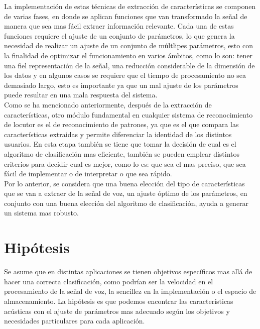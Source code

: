 La implementaci\'on de estas t\'ecnicas de extracci\'on de caracter\'isticas se componen de varias fases, en donde se aplican funciones que van transformado la señal de manera que sea mas f\'acil extraer informaci\'on relevante. Cada una de estas funciones requiere el ajuste de un conjunto de par\'ametros, lo que genera la necesidad de realizar un ajuste de un conjunto de m\'ultlipes par\'ametros, esto con la finalidad de optimizar el funcionamiento en varios \'ambitos, como lo son: tener una fiel representaci\'on de la señal, una reducci\'on considerable de la dimensi\'on de los datos y en algunos casos se requiere que el tiempo de procesamiento no sea demasiado largo, esto es importante ya que un mal ajuste de los par\'ametros puede resultar en una mala respuesta del sistema.\\

Como se ha mencionado anteriormente, despu\'es de la extracci\'on de caracter\'isticas, otro m\'odulo fundamental en cualquier sistema de reconocimiento de locutor es el de reconocimiento de patrones, ya que es el que compara las caracter\'isticas extraidas y permite diferenciar la identidad de los distintos usuarios. En esta etapa tambi\'en se tiene que tomar la decisi\'on de cual es el algoritmo de clasificaci\'on mas eficiente, tambi\'en se pueden emplear distintos criterios para decidir cual es mejor, como lo es: que  sea el mas preciso, que sea f\'acil de implementar o de interpretar o que sea r\'apido.\\

Por lo anterior, se considera que una buena elecci\'on del tipo de caracter\'isticas que se van a extraer de la señal de voz, un ajuste \'optimo de los par\'ametros, en conjunto con una buena elecci\'on del algoritmo de clasificaci\'on, ayuda a generar un sistema mas robusto.\\




\section{Hipótesis} \label{sect:hipotesis}

Se asume que en distintas aplicaciones se tienen objetivos especí­ficos mas allá de hacer una correcta clasificación, como podrí­an ser la velocidad en el procesamiento de la señal de voz, la sencillez en la implementación o el espacio de almacenamiento. La hipótesis es que podemos encontrar las caracterí­sticas acústicas con el ajuste de parámetros mas adecuado según los objetivos y necesidades particulares para cada aplicación.

